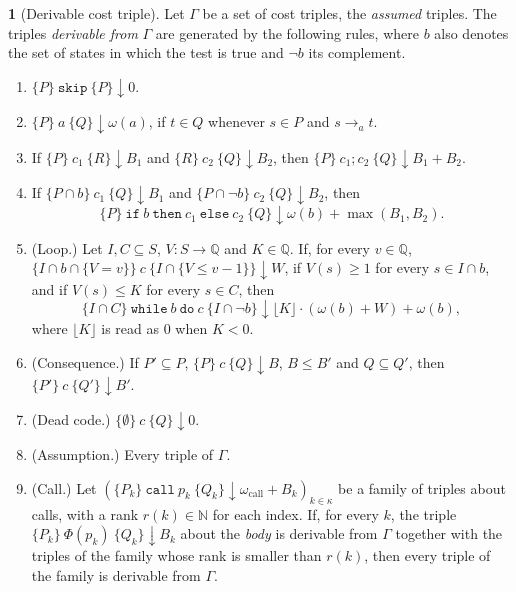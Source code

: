 \documentclass[oneside,english]{amsart}
\numberwithin{equation}{section}
\numberwithin{figure}{section}
\theoremstyle{plain}
\theoremstyle{definition}
\newtheorem{defn}[thm]{\protect\definitionname}
\theoremstyle{plain}
\theoremstyle{remark}
\theoremstyle{plain}
\theoremstyle{definition}
\theoremstyle{plain}
\theoremstyle{remark}
\providecommand{\definitionname}{Definition}
\begin{document}
\begin{defn}[Derivable cost triple]
\label{def:derivable-triple}
Let $\Gamma$ be a set of cost triples, the \emph{assumed} triples. The triples \emph{derivable from} $\Gamma$ are generated by the following rules, where $b$ also denotes the set of states in which the test is true and $\neg b$ its complement.
\begin{enumerate}
    \item $\{P\}\ \mathtt{skip}\ \{P\}\!\downarrow\! 0$.
    \item $\{P\}\ a\ \{Q\}\!\downarrow\! \omega(a)$, if $t \in Q$ whenever $s \in P$ and $s \to_a t$.
    \item If $\{P\}\ c_1\ \{R\}\!\downarrow\! B_1$ and $\{R\}\ c_2\ \{Q\}\!\downarrow\! B_2$, then $\{P\}\ c_1 ; c_2\ \{Q\}\!\downarrow\! B_1 + B_2$.
    \item If $\{P \cap b\}\ c_1\ \{Q\}\!\downarrow\! B_1$ and $\{P \cap \neg b\}\ c_2\ \{Q\}\!\downarrow\! B_2$, then
    \[
    \{P\}\ \mathtt{if}\ b\ \mathtt{then}\ c_1\ \mathtt{else}\ c_2\ \{Q\}\!\downarrow\! \omega(b) + \max(B_1, B_2).
    \]
    \item (Loop.) Let $I, C \subseteq S$, $V : S \to \mathbb{Q}$ and $K \in \mathbb{Q}$. If, for every $v \in \mathbb{Q}$, $\{I \cap b \cap \{V = v\}\}\ c\ \{I \cap \{V \le v - 1\}\}\!\downarrow\! W$, if $V(s) \ge 1$ for every $s \in I \cap b$, and if $V(s) \le K$ for every $s \in C$, then
    \[
    \{I \cap C\}\ \mathtt{while}\ b\ \mathtt{do}\ c\ \{I \cap \neg b\}\!\downarrow\! \lfloor K \rfloor \cdot (\omega(b) + W) + \omega(b),
    \]
    where $\lfloor K \rfloor$ is read as $0$ when $K < 0$.
    \item (Consequence.) If $P' \subseteq P$, $\{P\}\ c\ \{Q\}\!\downarrow\! B$, $B \le B'$ and $Q \subseteq Q'$, then $\{P'\}\ c\ \{Q'\}\!\downarrow\! B'$.
    \item (Dead code.) $\{\emptyset\}\ c\ \{Q\}\!\downarrow\! 0$.
    \item (Assumption.) Every triple of $\Gamma$.
    \item (Call.) Let $(\{P_k\}\ \mathtt{call}\ p_k\ \{Q_k\}\!\downarrow\! \omega_{\mathrm{call}} + B_k)_{k \in \kappa}$ be a family of triples about calls, with a rank $r(k) \in \mathbb{N}$ for each index. If, for every $k$, the triple $\{P_k\}\ \Phi(p_k)\ \{Q_k\}\!\downarrow\! B_k$ about the \emph{body} is derivable from $\Gamma$ together with the triples of the family whose rank is smaller than $r(k)$, then every triple of the family is derivable from $\Gamma$.
\end{enumerate}
\end{defn}
\end{document}
